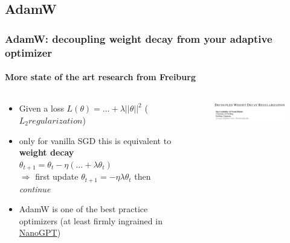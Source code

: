 \documentclass[
	11pt, %
	aspectratio=169, %
]{beamer}
\begin{document}

\subsection{AdamW}

\begin{frame}
	\frametitle{AdamW: decoupling weight decay from your adaptive optimizer}
	\framesubtitle{More state of the art research from Freiburg}
	 \begin{columns}[c] %
		\begin{column}{0.55\textwidth} %
			\begin{itemize}
				\item Given a loss $L(\theta) = \hdots + \lambda \vert \vert \theta \vert \vert^2 $ ($L_2 regularization$)
				\item only for vanilla SGD this is equivalent to \textbf{weight decay} \\
				 $\theta_{t+1} = \theta_t - \eta( \dots + \lambda \theta_t) $\\
				 \vspace{1em}
				 $\Longrightarrow$ first update $\theta_{t+1} = -\eta \lambda \theta_t$ then \textit{continue}
				 \item AdamW is one of the best practice optimizers (at least firmly ingrained in \href{https://github.com/karpathy/nanoGPT}{NanoGPT})

			\end{itemize}
		\end{column}
		\begin{column}{0.35\textwidth} %
        	\begin{figure}
        	    \centering
                \includegraphics[width=8cm]{figures/adamw.png}
        	    \caption*{}
        	\end{figure}
		\end{column}
	\end{columns}
\end{frame}
\end{document}
